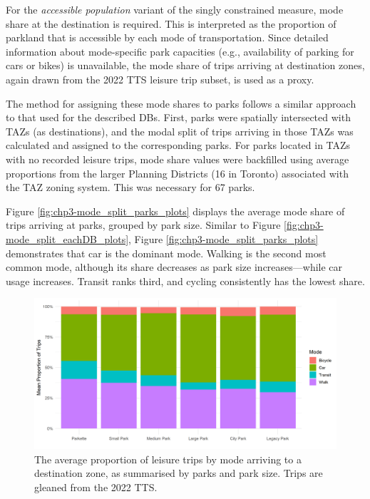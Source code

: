 \documentclass[
11pt, %
oneside, %
english, %
singlespacing, %
]{macthesis} %
\begin{document}
For the \emph{accessible population} variant of the singly constrained measure, mode share at the destination is required. This is interpreted as the proportion of parkland that is accessible by each mode of transportation. Since detailed information about mode-specific park capacities (e.g., availability of parking for cars or bikes) is unavailable, the mode share of trips arriving at destination zones, again drawn from the 2022 TTS leisure trip subset, is used as a proxy.

The method for assigning these mode shares to parks follows a similar approach to that used for the described DBs. First, parks were spatially intersected with TAZs (as destinations), and the modal split of trips arriving in those TAZs was calculated and assigned to the corresponding parks. For parks located in TAZs with no recorded leisure trips, mode share values were backfilled using average proportions from the larger Planning Districts (16 in Toronto) associated with the TAZ zoning system. This was necessary for 67 parks.

Figure \ref{fig:chp3-mode_split_parks_plots} displays the average mode share of trips arriving at parks, grouped by park size. Similar to Figure \ref{fig:chp3-mode_split_eachDB_plots}, Figure \ref{fig:chp3-mode_split_parks_plots} demonstrates that car is the dominant mode. Walking is the second most common mode, although its share decreases as park size increases---while car usage increases. Transit ranks third, and cycling consistently has the lowest share.

\begin{figure}

{\centering \includegraphics[width=6in]{./data/figures/chp3-mode_split_parks_plots} 

}

\caption{\label{fig:chp3-mode_split_parks_plots} The average proportion of leisure trips by mode arriving to a destination zone, as summarised by parks and park size. Trips are gleaned from the 2022 TTS. }\label{fig:unnamed-chunk-52}
\end{figure}
\end{document}
